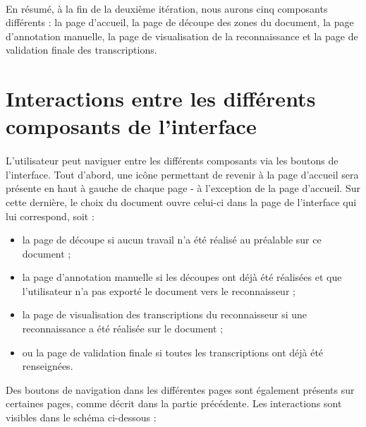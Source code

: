 \paragraph{}
En résumé, à la fin de la deuxième itération, nous aurons cinq composants différents : la page d’accueil, la page de découpe des zones du document, la page d’annotation manuelle, la page de visualisation de la reconnaissance et la page de validation finale des transcriptions.

\section{Interactions entre les différents composants de l'interface}

\paragraph{}
L’utilisateur peut naviguer entre les différents composants via les boutons de l’interface.
\newline{}
Tout d’abord, une icône permettant de revenir à la page d’accueil sera présente en haut à gauche de chaque page - à l’exception de la page d’accueil. Sur cette dernière, le choix du document ouvre celui-ci dans la page de l’interface qui lui correspond, soit :

\begin{itemize}
\item la page de découpe si aucun travail n’a été réalisé au préalable sur ce document ;
\item la page d’annotation manuelle si les découpes ont déjà été réalisées et que l’utilisateur n’a pas exporté le document vers le reconnaisseur ;
\item la page de visualisation des transcriptions du reconnaisseur si une reconnaissance a été réalisée sur le document ;
\item ou la page de validation finale si toutes les transcriptions ont déjà été renseignées.
\end{itemize}

Des boutons de navigation dans les différentes pages sont également présents sur certaines pages, comme décrit dans la partie précédente. Les interactions sont visibles dans le schéma ci-dessous :

